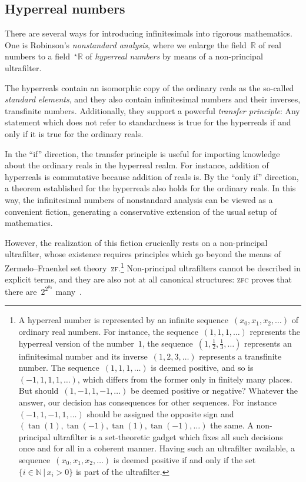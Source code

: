 \documentclass[oneside,reqno]{amsart}
\theoremstyle{definition}
\theoremstyle{plain}
\theoremstyle{remark}
\newcommand{\NN}{\mathbb{N}}
\newcommand{\RR}{\mathbb{R}}
\renewcommand{\_}{\mathpunct{.}\,}
\newcommand{\?}{\,{:}\,}
\begin{document}
\subsection{Hyperreal numbers} There are several ways for introducing
infinitesimals into rigorous mathematics. One is Robinson's \emph{nonstandard
analysis}, where we enlarge the field~$\RR$ of real numbers to a
field~$^\star\RR$ of \emph{hyperreal numbers} by means of a non-principal
ultrafilter.

The hyperreals contain an isomorphic copy of the ordinary reals as the
so-called \emph{standard elements}, and they also contain infinitesimal numbers
and their inverses, transfinite numbers. Additionally, they support a powerful \emph{transfer
principle}: Any statement which does not refer to standardness is true for the
hyperreals if and only if it is true for the ordinary reals.

In the ``if'' direction, the transfer principle is useful for importing
knowledge about the ordinary reals in the hyperreal realm. For instance,
addition of hyperreals is commutative because addition of reals is.
By the ``only if'' direction, a theorem established for the hyperreals also
holds for the ordinary reals. In this way, the infinitesimal numbers of
nonstandard analysis can be viewed as a convenient fiction, generating a
conservative extension of the usual setup of mathematics.

However, the realization of this fiction crucically rests on a non-principal
ultrafilter, whose existence requires principles which go beyond the means of
Zermelo--Fraenkel set theory~\textsc{zf}.\footnote{A hyperreal number is
represented by an infinite sequence~$(x_0,x_1,x_2,\ldots)$ of ordinary real
numbers. For instance, the sequence~$(1,1,1,\ldots)$ represents the hyperreal
version of the number~$1$, the sequence~$(1,\frac{1}{2},\frac{1}{3},\ldots)$
represents an infinitesimal number and its inverse~$(1,2,3,\ldots)$ represents
a transfinite number.
%
The sequence~$(1,1,1,\ldots)$ is deemed positive, and so is~$(-1,1,1,1,\ldots)$,
which differs from the former only in finitely many places. But
should~$(1,-1,1,-1,\ldots)$ be deemed positive or negative? Whatever the
answer, our decision has consequences for other sequences. For
instance~$(-1,1,-1,1,\ldots)$ should be assigned the opposite sign
and~$(\tan(1),\tan(-1),\tan(1),\tan(-1),\ldots)$ the same.
%
A non-principal ultrafilter is a set-theoretic gadget which fixes all such
decisions once and for all in a coherent manner. Having such an ultrafilter
available, a sequence~$(x_0,x_1,x_2,\ldots)$ is deemed positive if and only if
the set~$\{i \in \NN \,|\, x_i > 0\}$ is part of the ultrafilter.}
Non-principal ultrafilters cannot be described in explicit terms, and
they are also not at all canonical structures: \textsc{zfc} proves that there
are~$2^{2^{\aleph_0}}$ many~\cite{pospisil:ultrafilters}.
\end{document}
